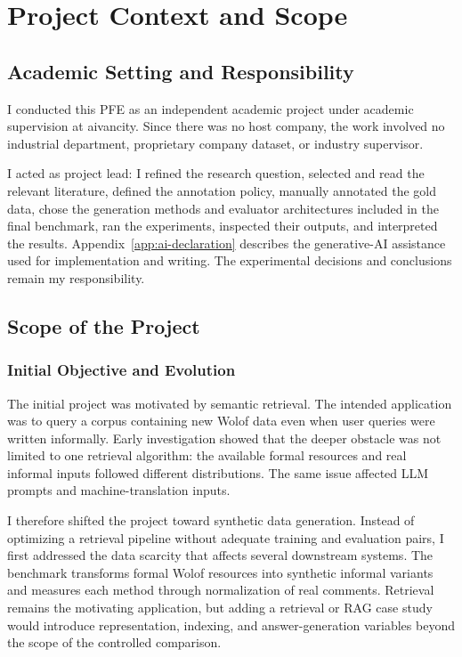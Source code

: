\documentclass[12pt, a4paper, twoside, openany]{report}
\begin{document}
\chapter{Project Context and Scope}
\label{chap:context}

\section{Academic Setting and Responsibility}

I conducted this PFE as an independent academic project under academic supervision at aivancity. Since there was no host company, the work involved no industrial department, proprietary company dataset, or industry supervisor.

I acted as project lead: I refined the research question, selected and read the relevant literature, defined the annotation policy, manually annotated the gold data, chose the generation methods and evaluator architectures included in the final benchmark, ran the experiments, inspected their outputs, and interpreted the results. Appendix~\ref{app:ai-declaration} describes the generative-AI assistance used for implementation and writing. The experimental decisions and conclusions remain my responsibility.

\section{Scope of the Project}

\subsection{Initial Objective and Evolution}

The initial project was motivated by semantic retrieval. The intended application was to query a corpus containing new Wolof data even when user queries were written informally. Early investigation showed that the deeper obstacle was not limited to one retrieval algorithm: the available formal resources and real informal inputs followed different distributions. The same issue affected LLM prompts and machine-translation inputs.

I therefore shifted the project toward synthetic data generation. Instead of optimizing a retrieval pipeline without adequate training and evaluation pairs, I first addressed the data scarcity that affects several downstream systems. The benchmark transforms formal Wolof resources into synthetic informal variants and measures each method through normalization of real comments. Retrieval remains the motivating application, but adding a retrieval or \ac{RAG} case study would introduce representation, indexing, and answer-generation variables beyond the scope of the controlled comparison.
\end{document}
